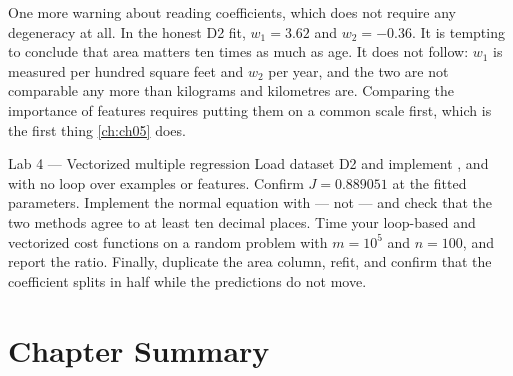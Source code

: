 One more warning about reading coefficients, which does not require any
degeneracy at all. In the honest D2 fit, $w_1 = 3.62$ and $w_2 = -0.36$. It is
tempting to conclude that area matters ten times as much as age. It does not
follow: $w_1$ is measured per hundred square feet and $w_2$ per year, and the two
are not comparable any more than kilograms and kilometres are. Comparing the
importance of features requires putting them on a common scale first, which is
the first thing \cref{ch:ch05} does.

\begin{labbox}{Lab 4 --- Vectorized multiple regression}
Load dataset D2 and implement ,  and
 with no loop over examples or features. Confirm
$J = 0.889051$ at the fitted parameters. Implement the normal equation with
 --- not  --- and check that the two methods
agree to at least ten decimal places. Time your loop-based and vectorized cost
functions on a random problem with $m = 10^5$ and $n = 100$, and report the
ratio. Finally, duplicate the area column, refit, and confirm that the
coefficient splits in half while the predictions do not move.
\end{labbox}

\section*{Chapter Summary}

